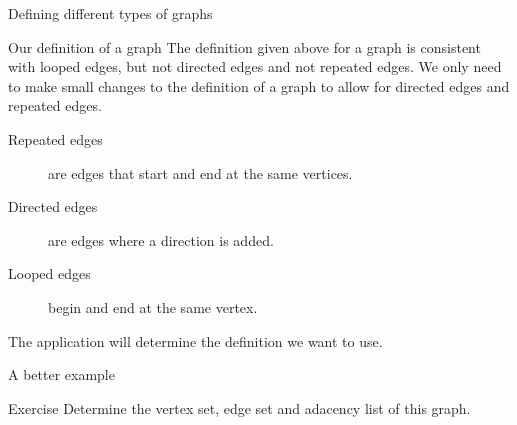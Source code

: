 \begin{frame}{Defining different types of graphs}
	
	\begin{block}{Our definition of a graph}
	The definition given above for a graph is consistent with looped edges, but not directed edges and not repeated edges. We only need to make small changes to the definition of a graph to allow for directed edges and repeated edges.
	\end{block}
	
	\begin{description}
		\item[Repeated edges] are edges that start and end at the same vertices.
		\item[Directed edges] are edges where a direction is added.
		\item[Looped edges] begin and end at the same vertex.
	\end{description}
	
	The application will determine the definition we want to use.
\end{frame}


\begin{frame}{A better example}
  \begin{adjustbox}{max width={0.9\textwidth},center} 
  \end{adjustbox}
  \vspace{0.1cm}
  \begin{block}{Exercise}
	Determine the vertex set, edge set and adacency list of this graph.
  \end{block}
  
\end{frame}


